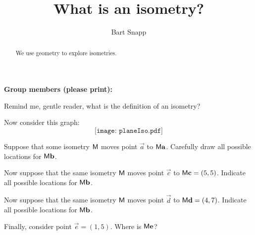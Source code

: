 \documentclass[noauthor,nooutcomes]{ximera}
\title{What is an isometry?}
\author{Bart Snapp}
\begin{document}
\begin{abstract}
We use geometry to explore isometries.
\end{abstract}
\maketitle

\noindent\textbf{Group members (please print):}\ \hrulefill \\

\hrulefill

\begin{problem}
Remind me, gentle reader, what is the definition of an isometry?

\vspace{2.5in}

\end{problem}

Now consider this graph:
\[
\texttt{[image: planeIso.pdf]}
\]

\begin{problem}
Suppose that some isometry $\mathsf{M}$ moves point $\vec{a}$ to
$\mathsf{M}\mathbf{a}$. Carefully draw all possible locations for
$\mathsf{M}\mathbf{b}$.
\end{problem}

\begin{problem}
Now suppose that the same isometry $\mathsf{M}$ moves point $\vec{c}$ to
$\mathsf{M}\mathbf{c} = (5,5)$. Indicate all possible locations for
$\mathsf{M}\mathbf{b}$.
\end{problem}

\begin{problem}
Now suppose that the same isometry $\mathsf{M}$ moves point $\vec{d}$ to
$\mathsf{M}\mathbf{d} = (4,7)$. Indicate all possible locations for
$\mathsf{M}\mathbf{b}$.
\end{problem}



\begin{problem}
Finally, consider point $\vec{e} = (1,5)$. Where is $\mathsf{M}\mathbf{e}$?
\end{problem}
\end{document}
